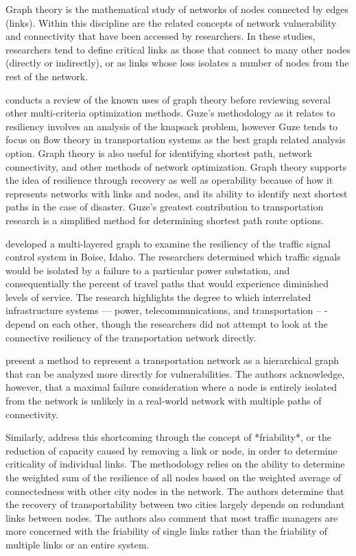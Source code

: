 Graph theory is the mathematical study of networks of nodes connected by
edges (links). Within
this discipline are the related concepts of network vulnerability and
connectivity that have been
accessed by researchers. In these studies, researchers tend to define
critical links as those
that connect to many other nodes (directly or indirectly), or as links
whose loss isolates a
number of nodes from the rest of the network.

\cite{guze2014} conducts a review of the known uses of graph theory before
reviewing several
other multi-criteria optimization methods. Guze’s methodology as it
relates to resiliency
involves an
analysis of the knapsack problem, however Guze tends to focus on flow
theory in transportation
systems as the best graph related analysis option. Graph theory is also
useful for identifying
shortest path, network connectivity, and other methods of network
optimization. Graph theory
supports the idea of resilience through recovery as well as operability
because of how it
represents networks with links and nodes, and its ability to identify next
shortest paths in the
case of disaster. Guze’s greatest contribution to transportation research
is a simplified method
for determining shortest path route options.

\cite{abdel2007} developed a multi-layered graph to examine the resiliency
of the traffic
signal control system in Boise, Idaho. The researchers determined which
traffic signals would be isolated by a failure to a particular power
substation,
and consequentially the percent of travel paths that would experience
diminished
levels of service. The research highlights the degree to which interrelated
infrastructure systems --- power, telecommunications, and transportation --
-
depend on each other, though the researchers did not attempt to look at the
connective resiliency of the transportation network directly.

\cite{agarwal2011} present a method to represent a transportation network
as a
hierarchical graph that can be analyzed more directly for vulnerabilities.
The
authors acknowledge, however, that a maximal failure consideration where a
node
is entirely isolated from the network is unlikely in a real-world network
with
multiple paths of connectivity.

Similarly, \cite{ip2011} address this shortcoming through the concept of
*friability*, or
the reduction of capacity caused by removing a link or node, in order to
determine criticality of individual links. The methodology relies on the
ability
to determine the weighted sum of the resilience of all nodes based on the
weighted average of connectedness with other city nodes in the network. The
authors determine that the recovery of transportability between two cities
largely depends on redundant links between nodes. The authors also comment
that
most traffic managers are more concerned with the friability of single
links
rather than the friability of multiple links or an entire system.

